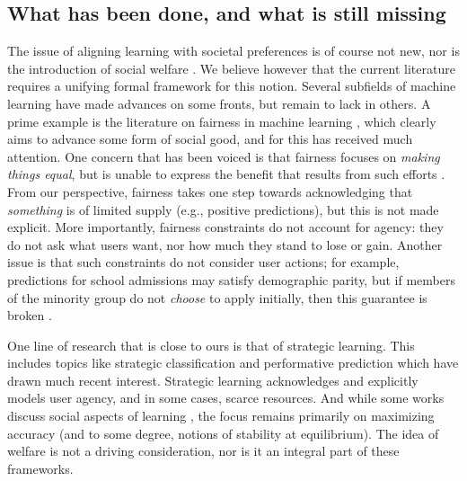 \subsection{What has been done, and what is still missing}
The issue of aligning learning with societal preferences is of course not new,
nor is the introduction of social welfare
\citep{shirali24allocation,perdomo2024the}.
We believe however that the current literature requires a unifying formal framework 
for this notion.
Several subfields of machine learning have made advances on some fronts, but remain to lack in others.
A prime example is the literature on fairness in machine learning \citep{dwork2012fairness},
which clearly aims to advance some form of social good,
and for this has received much attention.
One concern that has been voiced is that fairness focuses on \emph{making things equal}, but is unable to express the benefit that results from such efforts
\citep{heidari2018fairness,hu2020fair}.
From our perspective, fairness takes one step towards acknowledging that \emph{something} is of limited supply (e.g., positive predictions),
but this is not made explicit.
More importantly, fairness constraints do not account for agency:
they do not ask what users want,
nor how much they stand to lose or gain. %
Another issue is that such constraints do not consider 
user actions;
for example, predictions for school admissions may satisfy demographic parity,
but if members of the minority group do not \emph{choose} to apply initially,
then this guarantee is broken \citep{horowitz2024classification}.
\squeeze

One line of research that is close to ours is that of strategic learning.
This includes topics like strategic classification
\citep{bruckner2012static,hardt2016strategic}
and performative prediction \citep{perdomo2020performative} which have drawn much recent interest.
Strategic learning acknowledges and explicitly models user agency,
and in some cases, scarce resources.
And while some works discuss social aspects of learning
\citep[e.g.,][]{milli2019social},
the focus remains primarily on maximizing accuracy
(and to some degree, notions of stability at equilibrium).
The idea of welfare is not a driving consideration,
nor is it an integral part of these frameworks.

